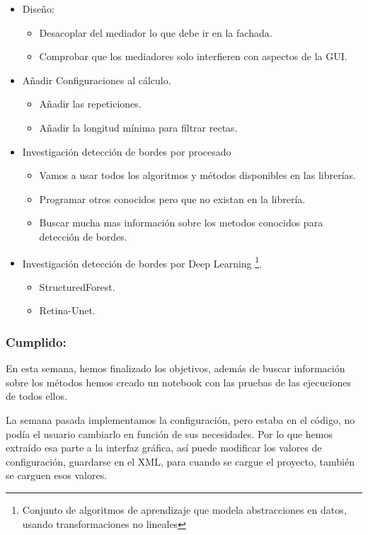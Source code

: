 \begin{itemize}
	\item Diseño:
		\begin{itemize}
			\item Desacoplar del mediador lo que debe ir en la fachada.
			\item Comprobar que los mediadores solo interfieren con aspectos de la GUI.
		\end{itemize}	
	\item Añadir Configuraciones al cálculo.
		\begin{itemize}
			\item Añadir las repeticiones.
			\item Añadir la longitud mínima para filtrar rectas.
		\end{itemize}
		\item Investigación detección de bordes por procesado
			\begin{itemize}
				\item Vamos a usar todos los algoritmos y métodos disponibles en las librerías.
				\item Programar otros conocidos pero que no existan en la librería.
				\item Buscar mucha mas información sobre los metodos conocidos para detección de bordes.
			\end{itemize}					
		\item Investigación detección de bordes por Deep Learning \cite{wiki:deep} \footnote{Conjunto de algoritmos de aprendizaje que modela abstracciones en datos, usando transformaciones no lineales}.
			\begin{itemize}
				\item StructuredForest.
				\item Retina-Unet. 
			\end{itemize}
\end{itemize}
\subsubsection{Cumplido:}
En esta semana, hemos finalizado los objetivos, además de buscar información sobre los métodos hemos creado un notebook con las pruebas de las ejecuciones de todos ellos.

La semana pasada implementamos la configuración, pero estaba en el código, no podía el usuario cambiarlo en función de sus necesidades.
Por lo que hemos extraído esa parte a la interfaz gráfica, así puede modificar los valores de configuración, guardarse en el XML, para cuando se cargue el proyecto, también se carguen esos valores.

